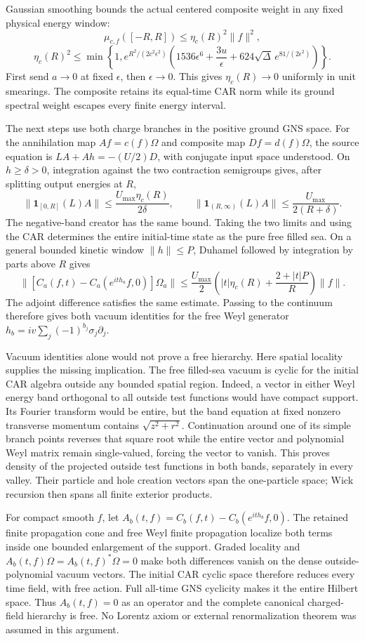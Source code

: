 Gaussian smoothing bounds the actual centered composite weight
in any fixed physical energy window:
\[
 \mu_{c,f}([-R,R])\le \eta_c(R)^2\|f\|^2,
\]
\[
 \eta_c(R)^2\le\min\!\left\{1,
 e^{R^2/(2c^2\epsilon^2)}
 \left(1536\epsilon^6+\frac{3u}{\epsilon}
       +624\sqrt\Delta\,e^{81/(2\epsilon^2)}\right)\right\}.
\]
First send $a\to0$ at fixed $\epsilon$, then $\epsilon\to0$.
This gives $\eta_c(R)\to0$ uniformly in unit smearings. The composite
retains its equal-time CAR norm while its ground spectral weight
escapes every finite energy interval.

The next steps use both charge branches in the positive ground GNS
space. For the annihilation map $Af=c(f)\Omega$ and composite map
$Df=d(f)\Omega$, the source equation is
$LA+Ah=-(U/2)D$, with conjugate input space understood.
On $h\ge\delta>0$, integration against the two contraction semigroups
gives, after splitting output energies at $R$,
\[
 \|\mathbf1_{[0,R]}(L)A\|\le\frac{U_{\max}\eta_c(R)}{2\delta},
 \qquad
 \|\mathbf1_{(R,\infty)}(L)A\|
 \le\frac{U_{\max}}{2(R+\delta)}.
\]
The negative-band creator has the same bound. Taking the two limits
and using the CAR determines the entire initial-time state as the
pure free filled sea. On a general bounded kinetic window
$\|h\|\le P$, Duhamel followed by integration by parts above $R$ gives
\[
 \|[C_a(f,t)-C_a(e^{ith_a}f,0)]\Omega_a\|
 \le\frac{U_{\max}}2
 \left(|t|\eta_c(R)+\frac{2+|t|P}{R}\right)\|f\|.
\]
The adjoint difference satisfies the same estimate. Passing to the
continuum therefore gives both vacuum identities for the free Weyl
generator $h_b=i v\sum_j(-1)^{b_j}\sigma_j\partial_j$.

Vacuum identities alone would not prove a free hierarchy. Here spatial
locality supplies the missing implication. The free filled-sea vacuum
is cyclic for the initial CAR algebra outside any bounded spatial
region. Indeed, a vector in either Weyl energy band orthogonal to all
outside test functions would have compact support. Its Fourier transform
would be entire, but the band equation at fixed nonzero transverse
momentum contains $\sqrt{z^2+r^2}$. Continuation around one of its
simple branch points reverses that square root while the entire vector
and polynomial Weyl matrix remain single-valued, forcing the vector
to vanish. This proves density of the projected outside test functions
in both bands, separately in every valley. Their particle and hole
creation vectors span the one-particle space; Wick recursion then
spans all finite exterior products.

For compact smooth $f$, let
$A_b(t,f)=C_b(f,t)-C_b(e^{ith_b}f,0)$. The retained finite propagation
cone and free Weyl finite propagation localize both terms inside one
bounded enlargement of the support. Graded locality and
$A_b(t,f)\Omega=A_b(t,f)^*\Omega=0$ make both differences vanish on
the dense outside-polynomial vacuum vectors. The initial CAR cyclic
space therefore reduces every time field, with free action. Full
all-time GNS cyclicity makes it the entire Hilbert space. Thus
$A_b(t,f)=0$ as an operator and the complete canonical charged-field
hierarchy is free. No Lorentz axiom or external renormalization theorem
was assumed in this argument.

